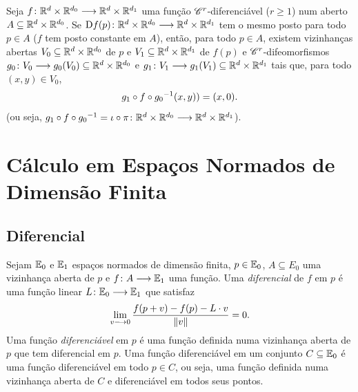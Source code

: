 \begin{prop}
Seja $f\colon \mathbb{R}^{d} \times \mathbb{R}^{d_0} \longrightarrow \mathbb{R}^{d} \times \mathbb{R}^{d_1}$ uma função $\mathscr{C}^r$-diferenciável ($r \geq 1$) num aberto $A \subseteq \mathbb{R}^{d} \times \mathbb{R}^{d_0}$. Se $\mathrm{D} f(p)\colon \mathbb{R}^{d} \times \mathbb{R}^{d_0} \longrightarrow \mathbb{R}^{d} \times \mathbb{R}^{d_1}$ tem o mesmo posto para todo $p \in A$ ($f$ tem posto constante em $A$), então, para todo $p \in A$, existem vizinhanças abertas $V_0 \subseteq \mathbb{R}^{d} \times \mathbb{R}^{d_0}$ de $p$ e $V_1 \subseteq \mathbb{R}^{d} \times \mathbb{R}^{d_1}$ de $f(p)$ e $\mathscr{C}^r$-difeomorfismos $g_0\colon V_0 \longrightarrow g_0(V_0) \subseteq \mathbb{R}^{d} \times \mathbb{R}^{d_0}$ e $g_1\colon V_1 \longrightarrow g_1(V_1) \subseteq \mathbb{R}^{d} \times \mathbb{R}^{d_1}$ tais que, para todo $(x,y) \in V_0$, 
	\begin{equation*}
	g_1 \circ f \circ {g_0}^{-1}(x,y))=(x,0).
	\end{equation*}
(ou seja, $g_1 \circ f \circ {g_0}^{-1} = \iota \circ \pi\colon \mathbb{R}^{d} \times \mathbb{R}^{d_0} \longrightarrow \mathbb{R}^{d} \times \mathbb{R}^{d_1}$).
\end{prop}















\cleardoublepage
\section{Cálculo em Espaços Normados de Dimensão Finita}

\subsection{Diferencial}

\begin{defi}
Sejam $\mathbb{E}_0$ e $\mathbb{E}_1$ espaços normados de dimensão finita, $p \in \mathbb{E}_0$, $A \subseteq E_0$ uma vizinhança aberta de $p$ e $f\colon A \longrightarrow \mathbb{E}_1$ uma função. Uma \emph{diferencial} de $f$ em $p$ é uma função linear $L\colon \mathbb{E}_0 \longrightarrow \mathbb{E}_1$ que satisfaz
	\begin{equation*}
	\lim_{v \longrightarrow 0} \frac{f(p+v) - f(p)-L \cdot v}{\left\Vert{v}\right\Vert} = 0.
	\end{equation*}
Uma função \emph{diferenciável} em $p$ é uma função definida numa vizinhança aberta de $p$ que tem diferencial em $p$. Uma função diferenciável em um conjunto $C \subseteq \mathbb{E}_0$ é uma função diferenciável em todo $p \in C$, ou seja, uma função definida numa vizinhança aberta de $C$ e diferenciável em todos seus pontos.
\end{defi}

